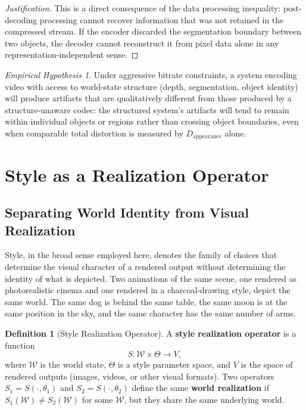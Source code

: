 \documentclass[11pt,a4paper]{article}
\theoremstyle{plain}
\theoremstyle{definition}
\newtheorem{definition}[theorem]{Definition}
\theoremstyle{remark}
\newtheorem{hypothesis}[theorem]{Empirical Hypothesis}
\begin{document}
\begin{proof}[Justification]
This is a direct consequence of the data processing inequality: post-decoding processing cannot recover information that was not retained in the compressed stream. If the encoder discarded the segmentation boundary between two objects, the decoder cannot reconstruct it from pixel data alone in any representation-independent sense.
\end{proof}

\begin{hypothesis}
\label{hyp:structure-ratedistortion}
Under aggressive bitrate constraints, a system encoding video with access to world-state structure (depth, segmentation, object identity) will produce artifacts that are qualitatively different from those produced by a structure-unaware codec: the structured system's artifacts will tend to remain within individual objects or regions rather than crossing object boundaries, even when comparable total distortion is measured by $D_{\mathrm{appearance}}$ alone.
\end{hypothesis}


\section{Style as a Realization Operator}
\label{sec:style}

\subsection{Separating World Identity from Visual Realization}

Style, in the broad sense employed here, denotes the family of choices that determine the visual character of a rendered output without determining the identity of what is depicted. Two animations of the same scene, one rendered as photorealistic cinema and one rendered in a charcoal-drawing style, depict the same world. The same dog is behind the same table, the same moon is at the same position in the sky, and the same character has the same number of arms.

\begin{definition}[Style Realization Operator]
A \textbf{style realization operator} is a function
\[
S: \mathcal{W} \times \Theta \to V,
\]
where $\mathcal{W}$ is the world state, $\Theta$ is a style parameter space, and $V$ is the space of rendered outputs (images, videos, or other visual formats). Two operators $S_1 = S(\cdot, \theta_1)$ and $S_2 = S(\cdot, \theta_2)$ define the same \textbf{world realization} if $S_1(\mathcal{W}) \neq S_2(\mathcal{W})$ for some $\mathcal{W}$, but they share the same underlying world.
\end{definition}
\end{document}
